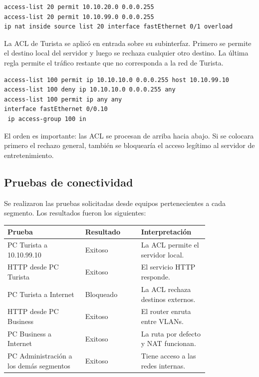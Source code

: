 \documentclass[12pt,a4paper]{article}
\begin{document}
\begin{verbatim}
access-list 20 permit 10.10.20.0 0.0.0.255
access-list 20 permit 10.10.99.0 0.0.0.255
ip nat inside source list 20 interface fastEthernet 0/1 overload
\end{verbatim}

La ACL de Turista se aplicó en entrada sobre su subinterfaz. Primero se permite el destino local del servidor y luego se rechaza cualquier otro destino. La última regla permite el tráfico restante que no corresponda a la red de Turista.

\begin{verbatim}
access-list 100 permit ip 10.10.10.0 0.0.0.255 host 10.10.99.10
access-list 100 deny ip 10.10.10.0 0.0.0.255 any
access-list 100 permit ip any any
interface fastEthernet 0/0.10
 ip access-group 100 in
\end{verbatim}

El orden es importante: las ACL se procesan de arriba hacia abajo. Si se colocara primero el rechazo general, también se bloquearía el acceso legítimo al servidor de entretenimiento.

\subsection{Pruebas de conectividad}
Se realizaron las pruebas solicitadas desde equipos pertenecientes a cada segmento. Los resultados fueron los siguientes:

\begin{center}
\small
\begin{tabular}{@{}p{0.32\linewidth}p{0.23\linewidth}p{0.25\linewidth}@{}}
\toprule
Prueba & Resultado & Interpretación \\
\midrule
PC Turista a 10.10.99.10 & Exitoso & La ACL permite el servidor local. \\
HTTP desde PC Turista & Exitoso & El servicio HTTP responde. \\
PC Turista a Internet & Bloqueado & La ACL rechaza destinos externos. \\
HTTP desde PC Business & Exitoso & El router enruta entre VLANs. \\
PC Business a Internet & Exitoso & La ruta por defecto y NAT funcionan. \\
PC Administración a los demás segmentos & Exitoso & Tiene acceso a las redes internas. \\
\bottomrule
\end{tabular}
\end{center}
\end{document}
